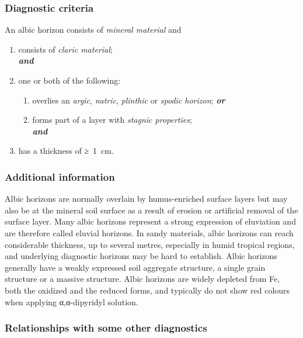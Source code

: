 \documentclass[
  letterpaper,
  DIV=11,
  numbers=noendperiod]{scrreprt}
\providecommand{\tightlist}{%
  \setlength{\itemsep}{0pt}\setlength{\parskip}{0pt}}\usepackage{longtable,booktabs,array}
\begin{document}
\hypertarget{diagnostic-criteria}{%
\subsubsection{Diagnostic criteria}\label{diagnostic-criteria}}

An albic horizon consists of \emph{mineral material} and

\begin{enumerate}
\def\labelenumi{\arabic{enumi}.}
\item
  consists of \emph{claric material};\\
  \textbf{\emph{and}}
\item
  one or both of the following:

  \begin{enumerate}
  \def\labelenumii{\alph{enumii}.}
  \tightlist
  \item
    overlies an \emph{argic}, \emph{natric}, \emph{plinthic} or
    \emph{spodic horizon}; \textbf{\emph{or}}
  \item
    forms part of a layer with \emph{stagnic properties};\\
    \textbf{\emph{and}}
  \end{enumerate}
\item
  has a thickness of ≥~1~cm.
\end{enumerate}

\hypertarget{additional-information}{%
\subsubsection{Additional information}\label{additional-information}}

Albic horizons are normally overlain by humus-enriched surface layers
but may also be at the mineral soil surface as a result of erosion or
artificial removal of the surface layer. Many albic horizons represent a
strong expression of eluviation and are therefore called eluvial
horizons. In sandy materials, albic horizons can reach considerable
thickness, up to several metres, especially in humid tropical regions,
and underlying diagnostic horizons may be hard to establish. Albic
horizons generally have a weakly expressed soil aggregate structure, a
single grain structure or a massive structure. Albic horizons are widely
depleted from Fe, both the oxidized and the reduced forms, and typically
do not show red colours when applying α,α-dipyridyl solution.

\hypertarget{relationships-with-some-other-diagnostics}{%
\subsubsection{Relationships with some other
diagnostics}\label{relationships-with-some-other-diagnostics}}
\end{document}
